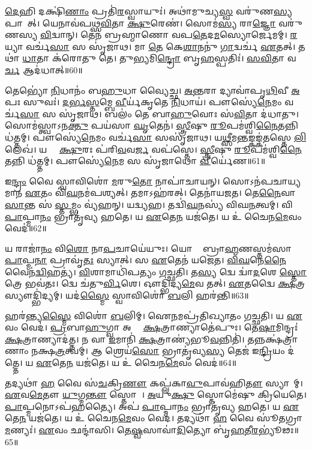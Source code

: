 \ul{𑌦𑍇}𑌹𑌿 𑌦𑌕𑍍𑌷𑌿॑\ul{𑌣𑌾𑌂} 𑌪𑍍𑌰𑌤𑌿॑\-\ul{𑌰}𑌸𑍍𑌵𑌾𑌯𑍁𑌃॑।
𑌅𑌥𑌾॑𑌮𑍁𑌚𑍍𑌯\ul{𑌸𑍍𑌵} 𑌵𑌰𑍁॑𑌣\ul{𑌸𑍍𑌯} 𑌪𑌾𑌶𑌾᳚𑌤𑍍।
𑌯𑍇𑌨𑌾𑌵॑𑌪𑌥𑍍𑌸\ul{𑌵𑌿}𑌤𑌾 \ul{𑌕𑍍𑌷𑍁}𑌰𑍇𑌣॑।
𑌸𑍋𑌮॑\ul{𑌸𑍍𑌯} 𑌰𑌾\ul{𑌜𑍍𑌞𑍋} 𑌵𑌰𑍁॑𑌣𑌸𑍍𑌯 \ul{𑌵𑌿}𑌦𑍍𑌵𑌾𑌨𑍍।
𑌤𑍇𑌨॑ 𑌬𑍍𑌰𑌹𑍍𑌮𑌾𑌣𑍋 𑌵𑌪\ul{𑌤𑍇}𑌦\ul{𑌮}𑌸𑍍𑌯𑍋𑌰𑍍𑌜𑍇𑌮𑌮𑍍।
\ul{𑌰}𑌯𑍍𑌯𑌾 𑌵𑌰𑍍𑌚॑\ul{𑌸𑌾} 𑌸 𑌸𑍃॑𑌜𑌾𑌥।
𑌮𑌾 \ul{𑌤𑍇} 𑌕𑍇\ul{𑌶𑌾}𑌨𑌨𑍁॑ \ul{𑌗𑌾}𑌦𑍍𑌵𑌰𑍍𑌚॑ \ul{𑌏}𑌤𑌤𑍍।
𑌤𑌥𑌾॑ \ul{𑌧𑌾}𑌤𑌾 𑌕॑𑌰𑍋𑌤𑍁 𑌤𑍇।
𑌤𑍁\ul{𑌭𑍍𑌯}𑌮𑌿\ul{𑌨𑍍𑌦𑍍𑌰𑍋} 𑌬𑍃\ul{𑌹}𑌸𑍍𑌪𑌤𑌿𑌃॑।
\ul{𑌸}\ul{𑌵𑌿}𑌤𑌾 𑌵\ul{𑌰𑍍𑌚} 𑌆𑌦॑𑌧𑌾𑌤𑍍॥60॥

𑌤𑍇𑌭𑍍𑌯𑍋॑ \ul{𑌨𑌿}𑌧𑌾𑌨𑌂॑ 𑌬\ul{𑌹𑍁}𑌧𑌾 𑌵𑍍𑌯𑍈𑌚𑍍𑌛\sn{}।
\ul{𑌅}\ul{𑌨𑍍𑌤}𑌰𑌾 𑌦𑍍𑌯𑌾𑌵𑌾॑𑌪𑍃\ul{𑌥𑌿}𑌵𑍀 \ul{𑌅}𑌪𑌃 𑌸𑍁𑌵𑌃॑।
\ul{𑌦}\ul{𑌰𑍍𑌭}\ul{𑌸𑍍𑌤}𑌮𑍍𑌬𑍇 \ul{𑌵𑍀}𑌰𑍍𑌯॑𑌕𑍃𑌤𑍇 \ul{𑌨𑌿}𑌧𑌾𑌯॑।
𑌪𑍗𑌸𑍍𑌯𑍇॑\ul{𑌨𑍇}𑌮𑌂 𑌵𑌰𑍍𑌚॑\ul{𑌸𑌾} 𑌸 𑌸𑍃॑𑌜𑌾𑌥।
𑌬𑌲𑌂॑ 𑌤𑍇 𑌬𑌾\ul{𑌹𑍁}𑌵𑍋𑌃 𑌸॑\ul{𑌵𑌿}𑌤𑌾 𑌦॑𑌧𑌾𑌤𑍁।
𑌸𑍋𑌮॑𑌸𑍍𑌤𑍍𑌵𑌾\-𑌽𑌨\ul{𑌕𑍍𑌤𑍁} 𑌪𑌯॑𑌸𑌾 \ul{𑌘𑍃}𑌤𑍇𑌨॑।
\ul{𑌸𑍍𑌤𑍍𑌰𑍀}𑌷𑍁 \ul{𑌰𑍂}𑌪𑌮॑𑌶𑍍𑌵𑌿\ul{𑌨𑍈}𑌤𑌨𑍍𑌨𑌿 𑌧॑𑌤𑍍𑌤𑌮𑍍।
𑌪𑍗𑌸𑍍𑌯𑍇॑\ul{𑌨𑍇}𑌮𑌂 𑌵𑌰𑍍𑌚॑\ul{𑌸𑌾} 𑌸𑌸𑍃॑𑌜𑌾𑌥।
𑌯\ul{𑌥𑍍𑌸𑍀}𑌮\ul{𑌨𑍍𑌤}𑌙𑍍𑌕𑌙𑍍𑌕॑𑌤𑌸𑍍𑌤𑍇 \ul{𑌲𑌿}𑌲𑍇𑌖॑।
𑌯𑌦𑍍𑌵𑌾᳚ \ul{𑌕𑍍𑌷𑍁}𑌰𑌃 𑌪॑𑌰𑌿\ul{𑌵}𑌵\ul{𑌰𑍍𑌜} 𑌵𑌪॑𑌸𑍍𑌤𑍇।
\ul{𑌸𑍍𑌤𑍍𑌰𑍀}𑌷𑍁 \ul{𑌰𑍂}𑌪𑌮॑𑌶𑍍𑌵𑌿\ul{𑌨𑍈}𑌤𑌨𑍍𑌨𑌿 𑌧॑𑌤𑍍𑌤𑌮𑍍।
𑌪𑍗𑌸𑍍𑌯𑍇॑\ul{𑌨𑍇}𑌮 𑌸 𑌸𑍃॑𑌜𑌾𑌥𑍋 \ul{𑌵𑍀}𑌰𑍍𑌯𑍇॑𑌣॥61॥\anuvakamend[𑌅𑌵𑌾᳚𑌸𑍍𑌰𑌾\ul{𑌗𑍍𑌦𑍀}𑌕𑍍𑌷𑌾 \ul{𑌵}𑌶𑌿\ul{𑌨𑍀} 𑌹𑍍𑌯𑍁॑𑌗𑍍𑌰𑌾\-𑌽𑌦॑𑌧𑌾\ul{𑌦𑍍𑌵}𑌵\ul{𑌰𑍍𑌜} 𑌵𑌪\dng{ꣴ}॑ \ul{𑌸𑍍𑌤𑍇} 𑌦𑍍𑌵𑍇 𑌚॑]

𑌇\ul{𑌨𑍍𑌦𑍍𑌰𑌂} 𑌵𑍈 𑌸𑍍𑌵𑌾𑌵𑌿𑌶𑍋॑ \ul{𑌮}𑌰𑍁\ul{𑌤𑍋} 𑌨𑌾𑌪𑌾॑𑌚𑌾𑌯𑌨𑍍।
𑌸𑍋𑌽𑌨॑𑌪𑌚𑌾𑌯𑍍𑌯𑌮𑌾𑌨 \ul{𑌏}𑌤𑌂 𑌵𑌿॑\ul{𑌘}𑌨𑌮॑𑌪𑌶𑍍𑌯𑌤𑍍।
𑌤𑌮𑌾𑌽𑌹॑𑌰𑌤𑍍।
𑌤𑍇𑌨𑌾॑𑌯𑌜𑌤।
𑌤𑍇\ul{𑌨𑍈}𑌵𑌾\ul{𑌸𑌾}𑌨𑍍𑌤 𑌸॑ \ul{𑌸𑍍𑌤}𑌮𑍍𑌭𑌂 𑌵𑍍𑌯॑𑌹𑌨𑍍।
𑌯𑌦𑍍𑌵𑍍𑌯𑌹\sn{}।
𑌤𑌦𑍍𑌵𑌿॑\ul{𑌘}𑌨𑌸𑍍𑌯॑ 𑌵𑌿𑌘\ul{𑌨}𑌤𑍍𑌵𑌮𑍍।
𑌵𑌿 \ul{𑌪𑌾}𑌪𑍍𑌮𑌾\ul{𑌨𑌂} 𑌭𑍍𑌰𑌾𑌤𑍃॑𑌵𑍍𑌯 𑌹𑌤𑍇।
𑌯 \ul{𑌏}𑌤𑍇\ul{𑌨} 𑌯𑌜॑𑌤𑍇।
𑌯 𑌉॑ 𑌚𑍈𑌨\ul{𑌮𑍇}𑌵𑌂 𑌵𑍇𑌦॑॥62॥

𑌯 𑌰𑌾𑌜𑌾॑\ul{𑌨𑌂} 𑌵𑌿\ul{𑌶𑍋} 𑌨𑌾\ul{𑌪}𑌚𑌾𑌯𑍇॑𑌯𑍁𑌃।
𑌯𑍋 𑌵𑌾᳚ 𑌬𑍍𑌰𑌾\ul{𑌹𑍍𑌮}𑌣𑌸𑍍𑌤𑌮॑𑌸𑌾 \ul{𑌪𑌾}𑌪𑍍𑌮\ul{𑌨𑌾} 𑌪𑍍𑌰𑌾𑌵𑍃॑\ul{𑌤𑌃} 𑌸𑍍𑌯𑌾𑌤𑍍।
𑌸 \ul{𑌏}𑌤𑍇𑌨॑ 𑌯𑌜𑍇𑌤।
\ul{𑌵𑌿}\ul{𑌘}𑌨𑍇\ul{𑌨𑍈}𑌵𑍈𑌨॑\ul{𑌦𑍍𑌵𑌿}𑌹𑌤𑍍𑌯॑।
\ul{𑌵𑌿}𑌶𑌾𑌮𑌾𑌧𑌿॑𑌪𑌤𑍍𑌯𑌂 𑌗𑌚𑍍𑌛𑌤𑌿।
𑌤\ul{𑌸𑍍𑌯} 𑌦𑍍𑌵𑍇 𑌦𑍍𑌵𑌾॑\ul{𑌦}𑌶𑍇 \ul{𑌸𑍍𑌤𑍋}𑌤𑍍𑌰𑍇 𑌭𑌵॑𑌤𑌃।
𑌦𑍍𑌵𑍇 𑌚॑𑌤𑍁\ul{𑌰𑍍𑌵𑌿}\ul{}𑌶𑍇।
𑌔𑌦𑍍𑌭𑌿॑𑌦𑍍𑌯\ul{𑌮𑍇}𑌵 𑌤𑌤𑍍।
\ul{𑌏}𑌤𑌦𑍍𑌵𑍈 \ul{𑌕𑍍𑌷}𑌤𑍍𑌰𑌸𑍍𑌯𑍗𑌦𑍍𑌭𑌿॑𑌦𑍍𑌯𑌮𑍍।
𑌯𑌦॑\ul{𑌸𑍍𑌮𑍈} 𑌸𑍍𑌵𑌾𑌵𑌿𑌶𑍋॑ \ul{𑌬}𑌲𑌿 𑌹𑌰॑𑌨𑍍𑌤𑌿॥63॥

𑌹𑌰॑𑌨𑍍𑌤𑍍𑌯\ul{𑌸𑍍𑌮𑍈} 𑌵𑌿𑌶𑍋॑ \ul{𑌬}𑌲𑌿𑌮𑍍।
𑌐\ul{𑌨}𑌮𑌪𑍍𑌰॑𑌤𑌿𑌖𑍍𑌯𑌾𑌤𑌂 𑌗𑌚𑍍𑌛𑌤𑌿।
𑌯 \ul{𑌏}𑌵𑌂 𑌵𑍇𑌦॑।
\ul{𑌪𑍍𑌰}𑌬𑌾\ul{𑌹𑍁}𑌗𑍍𑌵𑌾 𑌅𑌗𑍍𑌰𑍇᳚ \ul{𑌕𑍍𑌷}𑌤𑍍𑌰𑌾𑌣𑍍𑌯𑌾𑌤𑍇॑𑌪𑍁𑌃।
𑌤𑍇\ul{𑌷𑌾}𑌮𑌿𑌨𑍍𑌦𑍍𑌰𑌃॑ \ul{𑌕𑍍𑌷}𑌤𑍍𑌰𑌾𑌣𑍍𑌯𑌾𑌦॑𑌤𑍍𑌤।
𑌨 𑌵𑌾 \ul{𑌇}𑌮𑌾𑌨𑌿॑ \ul{𑌕𑍍𑌷}𑌤𑍍𑌰𑌾𑌣𑍍𑌯॑𑌭𑍂\ul{𑌵}𑌨𑍍𑌨𑌿𑌤𑌿॑।
𑌤𑌨𑍍𑌨𑌕𑍍𑌷॑𑌤𑍍𑌰𑌾𑌣𑌾𑌂 𑌨𑌕𑍍𑌷\ul{𑌤𑍍𑌰}𑌤𑍍𑌵𑌮𑍍।
𑌆 𑌶𑍍𑌰𑍇𑌯॑\ul{𑌸𑍋} 𑌭𑍍𑌰𑌾𑌤𑍃॑𑌵𑍍𑌯\ul{𑌸𑍍𑌯} 𑌤𑍇𑌜॑ 𑌇\ul{𑌨𑍍𑌦𑍍𑌰𑌿}𑌯𑌂 𑌦॑𑌤𑍍𑌤𑍇।
𑌯 \ul{𑌏}𑌤𑍇\ul{𑌨} 𑌯𑌜॑𑌤𑍇।
𑌯 𑌉॑ 𑌚𑍈𑌨\ul{𑌮𑍇}𑌵𑌂 𑌵𑍇𑌦॑॥64॥

𑌤𑌦𑍍𑌯𑌥𑌾॑ \ul{𑌹} 𑌵𑍈 𑌸॑\ul{𑌚}𑌕𑍍𑌰𑌿\ul{𑌣𑍗} 𑌕𑌪𑍍𑌲॑𑌕𑌾\ul{𑌵𑍁}𑌪𑌾𑌵॑𑌹𑌿\ul{𑌤𑍗} 𑌸𑍍𑌯𑌾𑌤𑌾᳚𑌮𑍍।
\ul{𑌏}𑌵\ul{𑌮𑍇}𑌤𑍗 \ul{𑌯𑍁}𑌗𑍍𑌮\ul{𑌨𑍍𑌤𑍗} 𑌸𑍍𑌤𑍋𑌮𑍗᳚।
\ul{𑌅}𑌯𑍁\ul{𑌕𑍍𑌷𑍁} 𑌸𑍍𑌤𑍋𑌮𑍇॑𑌷𑍁 𑌕𑍍𑌰𑌿𑌯𑍇𑌤𑍇।
\ul{𑌪𑌾}𑌪𑍍𑌮𑌨𑍋\-𑌽𑌪॑𑌹𑌤𑍍𑌯𑍈।
𑌅𑌪॑ \ul{𑌪𑌾}𑌪𑍍𑌮𑌾\ul{𑌨𑌂} 𑌭𑍍𑌰𑌾𑌤𑍃॑𑌵𑍍𑌯 𑌹𑌤𑍇।
𑌯 \ul{𑌏}𑌤𑍇\ul{𑌨} 𑌯𑌜॑𑌤𑍇।
𑌯 𑌉॑ 𑌚𑍈𑌨\ul{𑌮𑍇}𑌵𑌂 𑌵𑍇𑌦॑।
𑌤𑌦𑍍𑌯𑌥𑌾॑ \ul{𑌹} 𑌵𑍈 𑌸𑍂॑𑌤𑌗𑍍𑌰𑌾\ul{𑌮}𑌣𑍍𑌯𑌃॑।
\ul{𑌏}𑌵𑌂 𑌛𑌨𑍍𑌦𑌾॑𑌸𑌿।
𑌤𑍇\ul{𑌷𑍍𑌵}𑌸𑌾𑌵𑌾॑\ul{𑌦𑌿}𑌤𑍍𑌯𑍋 𑌬𑍃॑\ul{𑌹}𑌤𑍀\ul{𑌰}𑌭𑍍𑌯𑍂॑𑌢𑌃॥65॥

